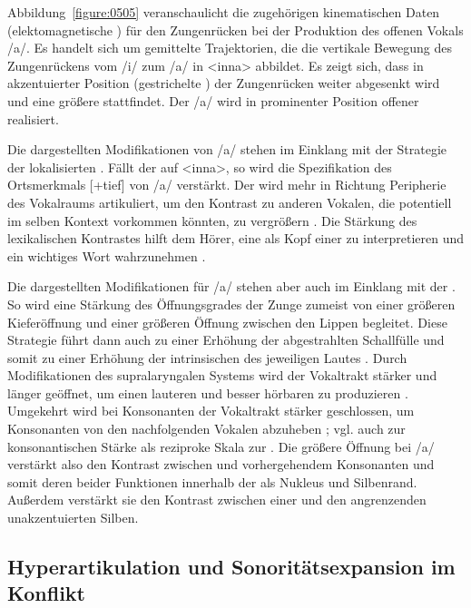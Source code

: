 Abbildung~\ref{figure:0505} veranschaulicht die zugehörigen kinematischen Daten (elektomagnetische ) für den Zungenrücken bei der Produktion des offenen Vokals /a/. Es handelt sich um gemittelte Trajektorien, die die vertikale Bewegung des Zungenrückens vom /i/ zum /a/ in <inna> abbildet. Es zeigt sich, dass in akzentuierter Position (gestrichelte ) der Zungenrücken weiter abgesenkt wird und eine größere  stattfindet. Der  /a/ wird in prominenter Position offener realisiert. 



Die dargestellten Modifikationen von /a/ stehen im Einklang mit der Strategie der lokalisierten . Fällt der  auf <inna>, so wird die Spezifikation des Ortsmerkmals [+tief] von /a/ verstärkt. Der  wird mehr in Richtung Peripherie des Vokalraums artikuliert, um den Kontrast zu anderen Vokalen, die potentiell im selben Kontext vorkommen könnten, zu vergrößern \citep[][41]{Harrington2000}. Die Stärkung des lexikalischen Kontrastes hilft dem Hörer, eine  als Kopf einer  zu interpretieren und ein wichtiges Wort wahrzunehmen \citep[][210]{DeJong1993}.

Die dargestellten Modifikationen für /a/ stehen aber auch im Einklang mit der . So wird eine Stärkung des Öffnungsgrades der Zunge zumeist von einer größeren Kieferöffnung und einer größeren Öffnung zwischen den Lippen begleitet. Diese Strategie führt dann auch zu einer Erhöhung der abgestrahlten Schallfülle und somit zu einer Erhöhung der intrinsischen  \citep{Sievers1876} des jeweiligen Lautes \citep{Beckman1992}. Durch Modifikationen des supralaryngalen Systems wird der Vokaltrakt stärker und länger geöffnet, um einen lauteren und besser hörbaren  zu produzieren \citep{Harrington2000}. Umgekehrt wird bei Konsonanten der Vokaltrakt stärker geschlossen, um Konsonanten von den nachfolgenden Vokalen abzuheben \citep{Cho2005a}; vgl. auch \citet{Vennemann1988} zur konsonantischen Stärke als reziproke Skala zur . Die größere Öffnung bei /a/ verstärkt also den Kontrast zwischen  und vorhergehendem Konsonanten und somit deren beider Funktionen innerhalb der  als Nukleus und Silbenrand. Außerdem verstärkt sie den Kontrast zwischen einer  und den angrenzenden unakzentuierten Silben.

\subsection{Hyperartikulation und Sonoritätsexpansion im Konflikt}
\label{subsec:050102}

